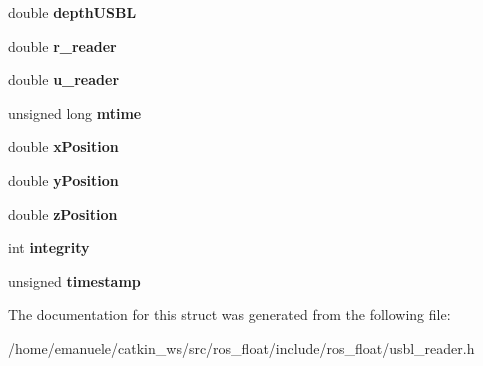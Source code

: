 \begin{DoxyCompactItemize}
double {\bfseries depth\+U\+S\+BL}
\item 
\mbox{\label{structUSBL__DATA_a102106844aee9e04e45629573ef99dbf}} 
double {\bfseries r\+\_\+reader}
\item 
\mbox{\label{structUSBL__DATA_a58fa02be969674c1298117356525f0f2}} 
double {\bfseries u\+\_\+reader}
\item 
\mbox{\label{structUSBL__DATA_aa3cd83c0023ee88d8630f1325281cfd2}} 
unsigned long {\bfseries mtime}
\item 
\mbox{\label{structUSBL__DATA_a26db296587adb3d461315d3ab347c8ad}} 
double {\bfseries x\+Position}
\item 
\mbox{\label{structUSBL__DATA_a665becdbc39316141aa5a8dd4f41fc18}} 
double {\bfseries y\+Position}
\item 
\mbox{\label{structUSBL__DATA_ab1770760f66b5d2ecbd34cfbfcb99c30}} 
double {\bfseries z\+Position}
\item 
\mbox{\label{structUSBL__DATA_a3accab090f58fa86babe87c310cae06b}} 
int {\bfseries integrity}
\item 
\mbox{\label{structUSBL__DATA_ab2ad8c42689b180c0677782c14868aa0}} 
unsigned {\bfseries timestamp}
\end{DoxyCompactItemize}


The documentation for this struct was generated from the following file\+:\begin{DoxyCompactItemize}
\item 
/home/emanuele/catkin\+\_\+ws/src/ros\+\_\+float/include/ros\+\_\+float/usbl\+\_\+reader.\+h\end{DoxyCompactItemize}
